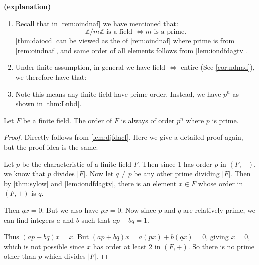 \documentclass{article}
\newcommand{\bfs}[1]{\textbf{({#1}) }}
\begin{document}
\begin{rema}\bfs{explanation}
\begin{enumerate}
    \item Recall that in \cref{rem:oindnaf} we have mentioned that:
$$\mathbb{Z} / m \mathbb{Z}\text{ is a field }\Longleftrightarrow m \text{ is a prime.}$$
\cref{thm:daiocd} can be viewed as the  of \cref{rem:oindnaf} where prime is from \cref{rem:oindnaf}, and same order of all elements follows from \cref{lem:iondfdagtv}.
\item  Under finite assumption, in general we have field $\Leftrightarrow$ entire (See \cref{cor:ndnad}), we therefore have that: 

\centerline{}

\item Note this  means any finite field have prime order. Instead, we have $p^n$ as shown in \cref{thm:Lnbd}.
\end{enumerate}
\end{rema}
\begin{thma}\label{thm:Lnbd}
Let $F$ be a finite field. The order of $F$ is always of order $p^{n}$ where $p$ is prime.
\end{thma}
\begin{proof} Directly follows from \cref{lem:djfdacf}. Here we give a detailed proof again, but the proof idea is the same:

 Let $p$ be the characteristic of a finite field $F$. Then since 1 has order $p$ in $(F,+)$, we know that $p$ divides $|F|$. Now let $q \neq p$ be any other prime dividing $|F|$. Then by \cref{thm:sylow} and \cref{lem:iondfdagtv}, there is an element $x \in F$ whose order in $(F,+)$ is $q$.
 
Then $q  x=0$. But we also have $p  x=0$. Now since $p$ and $q$ are relatively prime, we can find integers $a$ and $b$ such that $a p+b q=1$.

Thus $(a p+b q)  x=x$. But $(a p+b q)  x=a (p  x)+b (q  x)=0$, giving $x=0$, which is not possible since $x$ has order at least 2 in $(F,+)$.
So there is no prime other than $p$ which divides $|F|$.
\end{proof}
\end{document}

